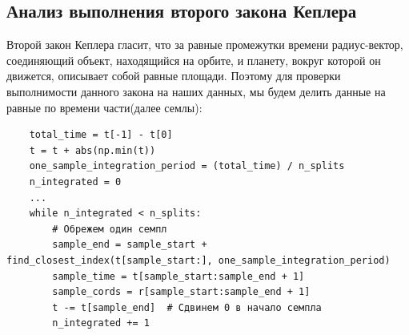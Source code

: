 \documentclass{article}
\begin{document}
    \subsection{Анализ выполнения второго закона Кеплера}
    Второй закон Кеплера гласит, что за равные промежутки времени радиус-вектор, соединяющий объект, находящийся на орбите, и планету, вокруг которой он движется, описывает собой равные площади. Поэтому для проверки выполнимости данного закона на наших данных, мы будем делить данные на равные по времени части(далее семлы):
    \begin{verbatim}
    total_time = t[-1] - t[0]
    t = t + abs(np.min(t))
    one_sample_integration_period = (total_time) / n_splits
    n_integrated = 0
    ...
    while n_integrated < n_splits:
        # Обрежем один семпл
        sample_end = sample_start + find_closest_index(t[sample_start:], one_sample_integration_period)
        sample_time = t[sample_start:sample_end + 1]
        sample_cords = r[sample_start:sample_end + 1]
        t -= t[sample_end]  # Сдвинем 0 в начало семпла
        n_integrated += 1
    \end{verbatim}
\end{document}
